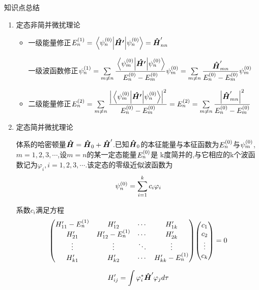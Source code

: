         \begin{formal}
            知识点总结  
            \begin{enumerate}
                \item 定态非简并微扰理论
                \begin{itemize}
                    \item 一级能量修正$ \pe{n}{1} = \ev{\vu*{H'}}{\pp{n}{0}} = \vu*{H}'_{nn} \quad $
                    
                    一级波函数修正$ 
                    \psi_{n}^{(1)} = \sum\limits_{m \neq n} \dfrac{\mel{\psi_{m}^{(0)}}{\vu*{H'}}{\psi_{n}^{(0)}}}{E_{n}^{(0)} - E_{m}^{(0)} } \psi_{m}^{(0)} =  
                    \sum\limits_{m \neq n} \dfrac{\vu*{H}'_{mn}}{E_{n}^{(0)} - E_{m}^{(0)} } \psi_{m}^{(0)}
                    $
                    
                    \item 二级能量修正$ 
                    E_{n}^{(2)} = \sum\limits_{m \neq n} \dfrac{\abs{\mel{\psi_{m}^{(0)}}{\vu*{H'}}{\psi_{n}^{(0)}}}^{2}}{E_{n}^{(0)} - E_{m}^{(0)}} = 
                    E_{n}^{(2)} = \sum\limits_{m \neq n} \dfrac{\abs{\vu*{H}'_{mn}}^{2}}{E_{n}^{(0)} - E_{m}^{(0)}}
                    $
                \end{itemize}

                \item 定态简并微扰理论
                
                体系的哈密顿量$\vu*{H} = \vu*{H}_{0} + \vu*{H}'$.已知$\vu*{H}_{0}$的本征能量与本征函数为$E_{n}^{(0)}$与$\psi_{m}^{(0)}$,$m=1,2,3,\cdots$,设$m=n$的某一定态能量$E_{n}^{(0)}$是
                k度简并的,与它相应的k个波函数记为$\varphi_{i},i=1,2,3,\cdots$.该定态的零级近似波函数为
                $$ \psi_{n}^{(0)} = \sum\limits_{i=1}^{k} c_{i} \varphi_{i} $$           
                
                系数${c_{i}}$满足方程
                $$ 
                \mqty(H_{11}'-\pe{n}{1} & H_{12}' & \cdots & H_{1k}' \\ H_{21}' & H_{12}'- \pe{n}{1} & \cdots & H_{2k}' \\ \vdots & \vdots & \ddots & \vdots \\ H_{k1}' & H_{k2}' & \cdots & H_{kk}'- \pe{n}{1} ) 
                \mqty(c_{1} \\ c_{2} \\ \vdots \\ c_{k}) = 0 
                $$

                $$ H_{ij}' = \int \varphi_{i}^{*} \vu*{H}' \varphi_{j} d\tau $$
                

\end{enumerate}
\end{formal}
